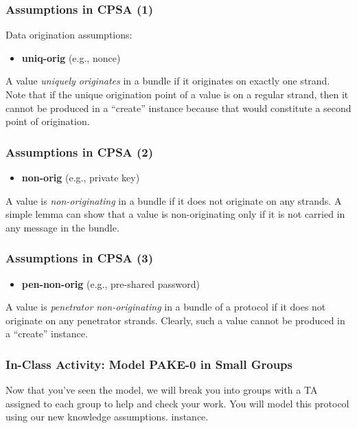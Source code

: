 \documentclass[red]{beamer}
\begin{document}
\begin{frame}\frametitle{Assumptions in CPSA (1)}
Data origination assumptions:
\begin{itemize}
\item \textbf{uniq-orig} (e.g., nonce)
\end{itemize}
\begin{definition}
A value \emph{uniquely originates} in a bundle if it originates on exactly one strand. 
Note that if the unique origination point of a value is on a regular strand, then it cannot be produced in a ``create'' instance because that would constitute a second point of origination.
\end{definition}
\end{frame}

\begin{frame}\frametitle{Assumptions in CPSA (2)}
\begin{itemize}
\item \textbf{non-orig} (e.g., private key)
\end{itemize}
\begin{definition}
A value is \emph{non-originating} in a bundle if it does not originate on any strands. 
A simple lemma can show that a value is non-originating only if it is not carried in any message in the bundle.
\end{definition}
\end{frame}

\begin{frame}\frametitle{Assumptions in CPSA (3)}
\begin{itemize}
\item \textbf{pen-non-orig} (e.g., pre-shared password)
\end{itemize}
\begin{definition}
A value is \emph{penetrator non-originating} in a bundle of a protocol if it does not originate on any penetrator strands. 
Clearly, such a value cannot be produced in a ``create''
instance.
\end{definition}
\end{frame}

\begin{frame}\frametitle{In-Class Activity: Model PAKE-0 in Small Groups}
Now that you've seen the model, we will break you into groups with a TA assigned to each group to help and check your work. You will model this protocol using our new knowledge assumptions.
instance.
\end{frame}
\end{document}
